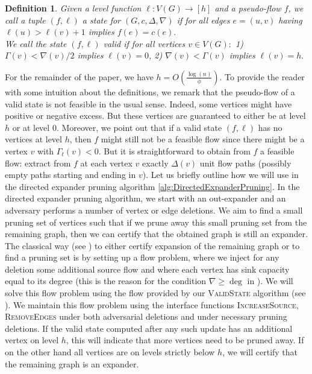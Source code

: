 \documentclass[11pt]{article}
\newtheorem{definition}[theorem]{Definition}
\newcommand\bell{\boldsymbol{\mathit{\ell}}}
\newcommand\cc{\boldsymbol{\mathit{c}}}
\newcommand\ff{\boldsymbol{\mathit{f}}}
\begin{document}
\begin{definition}\label{def:state}
    Given a level function $\bell: V(G) \rightarrow [h]$ and a pseudo-flow $\ff$, we call a tuple $(\ff, \bell)$ a state for $(G, \cc, \Delta, \nabla)$ if for all edges $e = (u, v)$ having $\bell(u) > \bell(v) + 1$ implies $\ff(e) = \cc(e).$\\
    We call the state $(\ff, \bell)$ valid if for all vertices $v \in V(G):$ 1) $\Gamma(v) < \nabla(v)/2$ implies $\bell(v) = 0$, 2) $\nabla(v) < \Gamma(v)$ implies $\bell(v) = h.$
\end{definition}

For the remainder of the paper, we have $h = O\left(\frac{\log(n)}{\phi}\right)$. To provide the reader with some intuition about the definitions, we remark that the pseudo-flow of a valid state is not feasible in the usual sense. Indeed, some vertices might have positive or negative excess. But these vertices are guaranteed to either be at level $h$ or at level $0$. Moreover, we point out that if a valid state $(\ff, \bell)$ has no vertices at level $h$, then $\ff$ might still not be a feasible flow since there might be a vertex $v$ with $\Gamma_t(v) < 0$. But it is straightforward to obtain from $\ff$ a feasible flow: extract from $\ff$ at each vertex $v$ exactly $\Delta(v)$ unit flow paths (possibly empty paths starting and ending in $v$). Let us briefly outline how we will use  in the directed expander pruning algorithm \ref{alg:DirectedExpanderPruning}. In the directed expander pruning algorithm, we start with an out-expander and an adversary performs a number of vertex or edge deletions. We aim to find a small pruning set of vertices such that if we prune away this small pruning set from the remaining graph, then we can certify that the obtained graph is still an expander. The classical way (see \cite{saranurak2019expander}) to either certify expansion of the remaining graph or to find a pruning set is by setting up a flow problem, where we inject for any deletion some additional source flow and where each vertex has sink capacity equal to its degree (this is the reason for the condition $\nabla \geq \deg $ in ). We will solve this flow problem using the flow provided by our \textsc{ValidState} algorithm (see ). We maintain this flow problem using the interface functions \textsc{IncreaseSource}, \textsc{RemoveEdges} under both adversarial deletions and under necessary pruning deletions. If the valid state computed after any such update has an additional vertex on level $h$, this will indicate that more vertices need to be pruned away. If on the other hand all vertices are on levels strictly below $h$, we will certify that the remaining graph is an expander.
\end{document}
